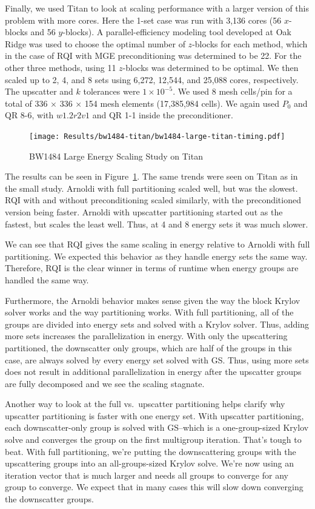 \documentclass{article}                                                                           %
\begin{document}
Finally, we used Titan to look at scaling performance with a larger version of this problem with more cores. Here the 1-set case was run with 3,136 cores (56 $x$-blocks and 56 $y$-blocks). A parallel-efficiency modeling tool developed at Oak Ridge was used to choose the optimal number of $z$-blocks for each method, which in the case of RQI with MGE preconditioning was determined to be 22. For the other three methods, using 11 $z$-blocks was determined to be optimal. We then scaled up to 2, 4, and 8 sets using 6,272, 12,544, and 25,088 cores, respectively. The upscatter and $k$ tolerances were $1 \times 10^{-5}$. We used 8 mesh cells/pin for a total of 336 $\times$ 336 $\times$ 154 mesh elements (17,385,984 cells). We again used $P_0$ and QR 8-6, with $w1.2r2v1$ and QR 1-1 inside the preconditioner.

\begin{figure}
\caption{BW1484  Large Energy Scaling Study on Titan}
\texttt{[image: Results/bw1484-titan/bw1484-large-titan-timing.pdf]}
\label{fig:titan}
\centering
\end{figure}
%
The results can be seen in Figure~\ref{fig:titan}. The same trends were seen on Titan as in the small study. Arnoldi with full partitioning scaled well, but was the slowest. RQI with and without preconditioning scaled similarly, with the preconditioned version being faster. Arnoldi with upscatter partitioning started out as the fastest, but scales the least well. Thus, at 4 and 8 energy sets it was much slower. 

We can see that RQI gives the same scaling in energy relative to Arnoldi with full partitioning. We expected this behavior as they handle energy sets the same way. Therefore, RQI is the clear winner in terms of runtime when energy groups are handled the same way. 

Furthermore, the Arnoldi behavior makes sense given the way the block Krylov solver works and the way partitioning works. With full partitioning, all of the groups are divided into energy sets and solved with a Krylov solver. Thus, adding more sets increases the parallelization in energy. With only the upscattering partitioned, the downscatter only groups, which are half of the groups in this case, are always solved by every energy set solved with GS. Thus, using more sets does not result in additional parallelization in energy after the upscatter groups are fully decomposed and we see the scaling stagnate. 

Another way to look at the full vs.\ upscatter partitioning helps clarify why upscatter partitioning is faster with one energy set. With upscatter partitioning, each downscatter-only group is solved with GS--which is a one-group-sized Krylov solve and converges the group on the first multigroup iteration. That's tough to beat. With full partitioning, we're putting the downscattering groups with the upscattering groups into an all-groups-sized Krylov solve. We're now using an iteration vector that is much larger and needs all groups to converge for any group to converge. We expect that in many cases this will slow down converging the downscatter groups. 
\end{document}

